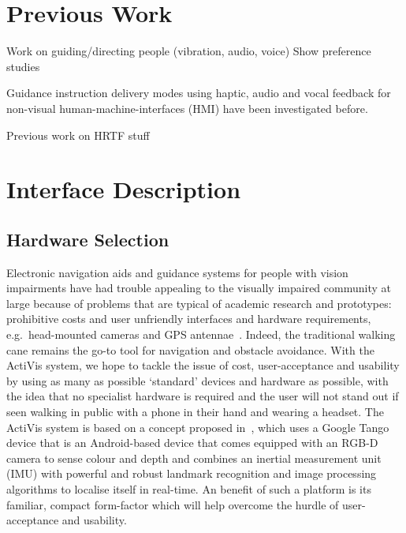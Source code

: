 \documentclass{llncs}
\begin{document}
\section{Previous Work}\label{sec:prev-work}

Work on guiding/directing people (vibration, audio, voice)
Show preference studies

Guidance instruction delivery modes using haptic, audio and vocal feedback for non-visual human-machine-interfaces (HMI) have been investigated before. 

Previous work on HRTF stuff


\section{Interface Description}\label{sec:interface-design}

\subsection{Hardware Selection}

Electronic navigation aids and guidance systems for people with vision impairments have had trouble appealing to the visually impaired community at large because of problems that are typical of academic research and prototypes: prohibitive costs and user unfriendly interfaces and hardware requirements, e.g.\ head-mounted cameras and GPS antennae~\cite{golledge2004stated,yusif2016older,arditi2013user}.
Indeed, the traditional walking cane remains the go-to tool for navigation and obstacle avoidance. 
With the ActiVis system, we hope to tackle the issue of cost, user-acceptance and usability by using as many as possible `standard' devices and hardware as possible, with the idea that no specialist hardware is required and the user will not stand out if seen walking in public with a phone in their hand and wearing a headset.
The ActiVis system is based on a concept proposed in~\cite{bellotto2013multimodal,lock2017portable}, which uses a Google Tango device that is an Android-based device that comes equipped with an RGB-D camera to sense colour and depth and combines an inertial measurement unit (IMU) with powerful and robust landmark recognition and image processing algorithms to localise itself in real-time.
An benefit of such a platform is its familiar, compact form-factor which will help overcome the hurdle of user-acceptance and usability.
\end{document}
